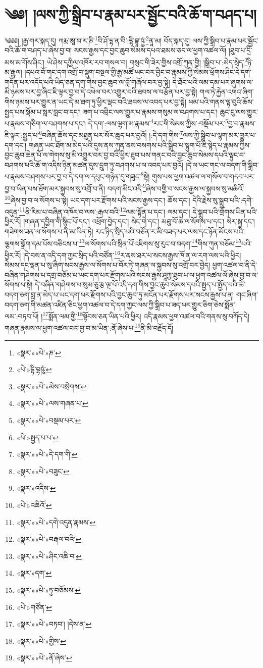 \chapter{༄༅། །ལས་ཀྱི་སྒྲིབ་པ་རྣམ་པར་སྦྱོང་བའི་ཆོ་ག་བཤད་པ།}༄༅༅། །རྒྱ་གར་སྐད་དུ། ཀརྨ་ཨཱ་བ་ར་ཎི་\footnote{«སྣར་»«པེ་»ཎ་}བི་ཤོ་དྷ་ན་བི་:དྷི་བྷཱ་ཥྱཾ་\footnote{«པེ་»དྷི་བྷཥུཾ་}ནཱ་མ། བོད་སྐད་དུ། ལས་ཀྱི་སྒྲིབ་པ་རྣམ་པར་སྦྱོང་བའི་ཆོ་ག་བཤད་པ་ཞེས་བྱ་བ། སངས་རྒྱས་དང་བྱང་ཆུབ་སེམས་དཔའ་ཐམས་ཅད་ལ་ཕྱག་འཚལ་ལོ། །ཐུབ་པ་དྲི་མས་མ་གོས་ཤིང་། ཡེ་ཤེས་དཀྱིལ་འཁོར་རབ་གསལ་བ། གསུང་གི་ཟེར་གྱིས་འགྲོ་ཀུན་གྱི། །སྒྲིབ་པ་:མེད་སྲེད་\footnote{«སྣར་»«པེ་»མེས་བསྲེགས་}ཉི་མ་རྒྱལ། །དཔའ་བོ་གང་དག་འགྲོ་བ་སྡུག་བསྔལ་གྱི་རྒྱ་མཚོ་ཡང་བར་བྱིང་བ་རྣམས་ཀྱི་སེམས་ཕྲོགས་ཤིང་དེ་དག་གདོན་པར་འདོད་པའི་ཡིད་ཅན་དག་གིས་བྱང་ཆུབ་ལ་བློ་གཞོལ་བར་བྱ་སྟེ། དེ་ཐོབ་པའི་ལམ་དམ་པར་ཞུགས་ལ་མི་ཉམས་པར་བྱ་ཞིང་ཇི་ལྟར་བྱ་བ་དེ་འཕེལ་བར་འགྱུར་བའི་ཐབས་ལ་བརྩོན་པར་བྱ་སྟེ། གལ་ཏེ་རྐྱེན་འགའ་ཞིག་གིས་ཉམས་པར་གྱུར་ན་ཡང་དེ་མ་ཐག་ཏུ་ཕྱིར་ལྡང་བའི་ཐབས་ལ་འབད་པར་བྱ་སྟེ། ཕམ་པའི་གནས་ལྟ་བུའི་ཆོས་སྤྱད་པས་སྡོམ་པ་སླར་བླང་བ་དང་། ཟག་པ་འབྲིང་ལས་གྱུར་པ་རྣམས་གསུམ་ལ་བཤགས་པ་དང་། ཆུང་ངུ་ལས་གྱུར་པ་རྣམས་གཅིག་ལ་བཤགས་པ་དང་། དེ་དག་:ལས་ལྷག་མ་རྣམས་\footnote{«སྣར་»«པེ་»ལས་གཞན་པ་}རང་གི་སེམས་ཀྱིས་:བསྡོམ་པར་\footnote{«སྣར་»«པེ་»བསྡམ་པར་}བྱ་བ་རྣམས་ཇི་ལྟར་:སྤྱད་པ་\footnote{«པེ་»སྤྱད་པ་པ་}བཞིན་ཆོས་དང་མཐུན་པར་སོར་ཆུད་པར་བྱའོ། །:དེ་དག་གིས་\footnote{«སྣར་»«པེ་»དེ་དག་གི་}ལས་ཀྱི་སྒྲིབ་པ་ལྷག་མར་གྱུར་པ་དག་དང་། གཞན་ཡང་ཐོག་མ་མེད་པའི་དུས་ནས་ཀུན་ནས་བསགས་པའི་སྒྲིབ་པ་སྟུག་པོ་ཇི་སྙེད་པ་རྣམས་ཀྱིས་བྱང་ཆུབ་ཆེན་པོ་ལ་གེགས་སུ་མི་འགྱུར་བར་བྱ་བའི་ཕྱིར་ཐུབ་པས་གནང་བའི་བྱང་ཆུབ་སེམས་དཔའི་ལྟུང་བ་བཤགས་པའི་ཆོ་ག་འདིས་ཉིན་མཚན་དུས་དྲུག་ཏུ་བཤགས་པ་ལ་འབད་པར་བྱའོ། །དེ་ལ་ཡང་གང་ལ་བདག་གི་སྒྲིབ་པ་རྣམས་བཤགས་པར་བྱ་བ་དེ་དག་ལ་དཔུང་གཉེན་དུ་གཟུང་\footnote{«སྣར་»«པེ་»བཟུང་}སྟེ། གུས་པས་ཕྱག་འཚལ་ལ་གསོལ་བ་གདབ་པར་བྱ་བ་ཡིན་པས་ཐོག་མར་སྐྱབས་སུ་འགྲོ་བ་ནི། བདག་མིང་འདི་\footnote{«སྣར་»འདིས་}ཞེས་བགྱི་བ་སངས་རྒྱས་ལ་སྐྱབས་སུ་མཆིའོ་\footnote{«པེ་»འཆིའོ་}ཞེས་བྱ་བ་ལ་སོགས་པ་སྟེ། ཡང་དག་པར་རྫོགས་པའི་སངས་རྒྱས་དང་། ཆོས་དང་། དེའི་རྗེས་སུ་སྒྲུབ་པའི་:དགེ་འདུན་\footnote{«སྣར་»«པེ་»དགེ་འདུན་རྣམས་}ནི་རིམ་པ་བཞིན་འཁོར་བ་ལས་:རྒལ་བའི་\footnote{«སྣར་»«པེ་»བརྒལ་བའི་}ལམ་སྟོན་པ་དང་། ལམ་དང་། དེ་སྒྲུབ་པའི་གྲོགས་ཡིན་པའི་ཕྱིར་རོ། །གཞན་དབྱིག་གི་སྙིང་པོ་དང་། འཕྲོག་བྱེད་དང་། སེང་གེ་དང་། མཐུ་བོ་ཆེ་ལ་སོགས་པ་དང་། སེར་སྐྱ་དང་། གཟེགས་ཟན་ལ་སོགས་པ་ནི་མ་ཡིན་ཏེ། རང་ཉིད་སྲིད་པའི་བཙོན་ར་མི་བཟད་པར་ལས་དང་ཉོན་མོངས་པའི་ལྕགས་སྒྲོག་དམ་པོས་བཅིངས་པ་\footnote{«སྣར་»«པེ་»ཤིང་འཆི་བ་}ལ་སོགས་པའི་སྲིན་པོ་འཇིགས་སུ་རུང་བ་བདག་\footnote{«སྣར་»དག་}གིས་ཀུན་བཅོམ་\footnote{«སྣར་»«པེ་»ཏུ་བཅོམས་}པའི་ཕྱིར་རོ། །དེ་བས་ན་འདི་དག་ཀྱང་སྲིད་པའི་བཙོན་\footnote{«པེ་»གཙོན་}ར་ནས་ཐར་པ་སངས་རྒྱས་ཁོ་ན་ལ་རག་ལས་པའི་ཕྱིར། སེམས་དང་ལྡན་པ་སུ་ཞིག་སངས་རྒྱས་ལ་སོགས་པ་བོར་ཏེ་གཞན་ལ་སྐྱབས་སུ་འགྲོ་བར་བྱེད། ཕྱག་འཚལ་བ་ནི་དེ་བཞིན་གཤེགས་པ་དགྲ་བཅོམ་པ་ཡང་དག་པར་རྫོགས་པའི་སངས་རྒྱས་ཤཱཀྱ་ཐུབ་པ་ལ་ཕྱག་འཚལ་ལོ་ཞེས་བྱ་བ་ལ་སོགས་པ་སྟེ། དེ་བཞིན་གཤེགས་པ་སུམ་ཅུ་རྩ་ལྔ་པོ་འདི་དག་གིས་བྱང་ཆུབ་སེམས་དཔའི་སྤྱད་པ་སྤྱོད་པའི་ཚེ་བདག་ཅག་བླ་ན་མེད་པ་ཡང་དག་པར་རྫོགས་པའི་བྱང་ཆུབ་ཏུ་མངོན་པར་རྫོགས་པར་སངས་རྒྱས་པ་ན། གང་ཞིག་བདག་ཅག་གི་མཚན་འཛིན་ཅིང་ཕྱག་འཚལ་བ་དེ་དག་ཀྱང་ལས་ཀྱི་སྒྲིབ་པ་ཟད་པར་གྱུར་ཅིག་ཅེས་སྨོན་ལམ་:བཏབ་པོ། །\footnote{«སྣར་»«པེ་»བཏབ་། །དེས་ན་}སྨོན་ལམ་གྱི་\footnote{«སྣར་»«པེ་»གྱིས་}སྟོབས་ཅན་ཡིན་པའི་ཕྱིར། འདི་རྣམས་ཕྱག་འཚལ་བའི་གནས་སུ་བཀོད་དེ། གཞན་རྣམས་ལ་ཕྱག་འཚལ་བར་བྱ་བ་མ་ཡིན་:ནོ་ཞེས་པ་\footnote{«སྣར་»«པེ་»ནོ་ཞེས་}ནི་མི་བརྗོད་དོ། 